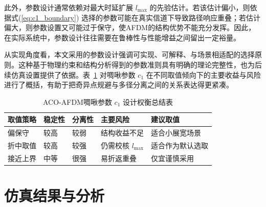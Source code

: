 此外，参数设计通常依赖对最大时延扩展 $l_{\max}$ 的先验估计。若该估计偏小，则依据式(\ref{eq:c1_boundary}) 选择的参数可能在真实信道下导致路径响应重叠；若估计偏大，则参数设置又可能过于保守，使AFDM的结构优势不能充分发挥。因此，在实际系统中，参数设计往往需要在鲁棒性与性能增益之间留出一定裕量。

从实现角度看，本文采用的参数设计强调可实现、可解释、与场景相适配的选择原则。这种基于物理约束和结构分析得到的参数准则具有明确的理论完整性，也为后续仿真设置提供了依据。表~\ref{tab:c1_design_tradeoff} 对啁啾参数 $c_1$ 在不同取值倾向下的主要收益与风险进行了概括，有助于把奇异点规避与多径分离之间的关系表达得更紧凑。

\begin{table}[H]
\centering
\caption{ACO-AFDM啁啾参数 $c_1$ 设计权衡总结表}
\label{tab:c1_design_tradeoff}
\footnotesize
\setlength{\tabcolsep}{4pt}
\begin{tabular}{p{1.8cm}p{2.1cm}p{2.1cm}p{1.9cm}p{3.2cm}}
\toprule
取值策略 & 稳定性 & 分离性 & 主要风险 & 建议取值 \\
\midrule
偏保守 & 较高 & 较弱 & 结构收益不足 & 适合小展宽场景 \\
折中取值 & 较高 & 较强 & 仍需校核 $l_{\max}$ & 适合作为默认选取 \\
接近上界 & 中等 & 很强 & 易折返重叠 & 仅宜谨慎采用 \\
\bottomrule
\end{tabular}
\end{table}

\section{仿真结果与分析} 
\label{sec:aco_afdm_sim}


